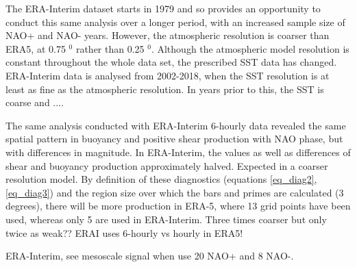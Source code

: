 



The ERA-Interim dataset starts in 1979 and so provides an opportunity to conduct this same analysis over a longer period, with an increased sample size of NAO+ and NAO- years. However, the atmospheric resolution is coarser than ERA5, at 0.75 $^{0}$ rather than 0.25 $^{0}$. Although the atmospheric model resolution is constant throughout the whole data set, the prescribed SST data has changed. ERA-Interim data is analysed from 2002-2018, when the SST resolution is at least as fine as the atmospheric resolution. In years prior to this, the SST is coarse and ....

The same analysis conducted with ERA-Interim 6-hourly data revealed the same spatial pattern in buoyancy and positive shear production with NAO phase, but with differences in magnitude. In ERA-Interim, the values as well as differences of shear and buoyancy production approximately halved. Expected in a coarser resolution model. By definition of these diagnostics (equations \ref{eq_diag2}, \ref{eq_diag3}) and the region size over which the bars and primes are calculated (3 degrees), there will be more production in ERA-5, where 13 grid points have been used, whereas only 5 are used in ERA-Interim.
Three times coarser but only twice as weak?? ERAI uses 6-hourly vs hourly in ERA5!

ERA-Interim, see mesoscale signal when use 20 NAO+ and 8 NAO-.

